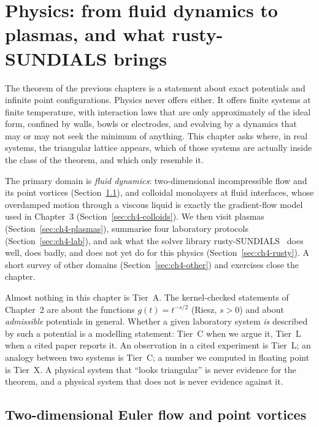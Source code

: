 \chapter{Physics: from fluid dynamics to plasmas, and what rusty-SUNDIALS brings}\label{ch:physics}

The theorem of the previous chapters is a statement about exact potentials and infinite point configurations.
Physics never offers either. It offers finite systems at finite temperature, with interaction laws that are only
approximately of the ideal form, confined by walls, bowls or electrodes, and evolving by a dynamics that may or
may not seek the minimum of anything. This chapter asks where, in real systems, the triangular lattice appears,
which of those systems are actually inside the class of the theorem, and which only resemble it.

The primary domain is \emph{fluid dynamics}: two-dimensional incompressible flow and its point vortices
(Section~\ref{sec:ch4-vortices}), and colloidal monolayers at fluid interfaces, whose overdamped motion through a
viscous liquid is exactly the gradient-flow model used in Chapter~3 (Section~\ref{sec:ch4-colloids}). We then visit
plasmas (Section~\ref{sec:ch4-plasmas}), summarise four laboratory protocols (Section~\ref{sec:ch4-lab}), and ask
what the solver library rusty-SUNDIALS~\cite{rusty} does well, does badly, and does not yet do for this physics
(Section~\ref{sec:ch4-rusty}). A short survey of other domains (Section~\ref{sec:ch4-other}) and exercises close the
chapter.

\begin{warnbox}
Almost nothing in this chapter is Tier~A. The kernel-checked statements of Chapter~2 are about the functions
$g(t)=t^{-s/2}$ (Riesz, $s>0$) and about \emph{admissible} potentials in general. Whether a given laboratory system
\emph{is} described by such a potential is a modelling statement: Tier~C when we argue it, Tier~L when a cited paper
reports it. An observation in a cited experiment is Tier~L; an analogy between two systems is Tier~C; a number we
computed in floating point is Tier~X. A physical system that ``looks triangular'' is never evidence for the
theorem, and a physical system that does not is never evidence against it.
\end{warnbox}

\section{Two-dimensional Euler flow and point vortices}\label{sec:ch4-vortices}

